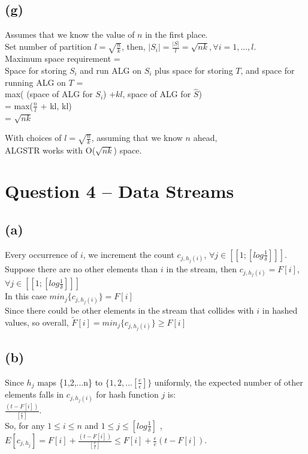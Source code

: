 \documentclass{article}
\begin{document}
\subsection{(g)}
Assumes that we know the value of $n$ in the first place. \\
Set number of partition $l = \sqrt{\frac{n}{k}}$, then, $|S_i| = \frac{|S|}{l} = \sqrt{nk}, \forall i=1,...,l$. \\
Maximum space requirement = \\ Space for storing $S_i$ and run ALG on $S_i$ plus space for storing $T$, and space for running ALG on $T$ =\\
 max( (space of ALG for $S_i$) $+ kl$, space of ALG for $\hat S$) \\
= max($\frac{n}{l}$ + kl, kl) \\
= $\sqrt{nk}$

With choices of $l = \sqrt{\frac{n}{k}}$, assuming that we know $n$ ahead, \\
ALGSTR works with O($\sqrt{nk}$) space.

\section{Question 4 -- Data Streams}
\subsection{(a)}
Every occurrence of $i$, we increment the count $c_{j,h_j(i)}$, $\forall j \in [[1; [log\frac{1}{\delta}]]]$. \\
Suppose there are no other elements than $i$ in the stream, then $c_{j,h_j(i)} = F[i]$, $\forall j \in [[1; [log\frac{1}{\delta}]]]$ \\ 
In this case $min_j\{c_{j,h_j(i)}\} = F[i]$ \\
Since there could be other elements in the stream that collides with $i$ in hashed values, so overall, $\tilde F[i] = min_j\{c_{j,h_j(i)}\} \ge F[i]$

\subsection{(b)}
Since $h_j$ maps \{1,2,...n\} to $\{1,2,...[\frac{e}{\epsilon}]\}$ uniformly, the expected number of other elements falls in $c_{j,h_j(i)}$ for hash function $j$ is: \\
$\frac{(t-F[i])}{[\frac{e}{\epsilon}]}$. \\
So, for any $1 \le i \le n$ and $1 \le j \le [log\frac{1}{\delta}]$ ,  $E[c_{j, h_j}] = F[i] + \frac{(t-F[i])}{[\frac{e}{\epsilon}]} \le F[i]+\frac{\epsilon}{e}(t-F[i])$.
\end{document}

